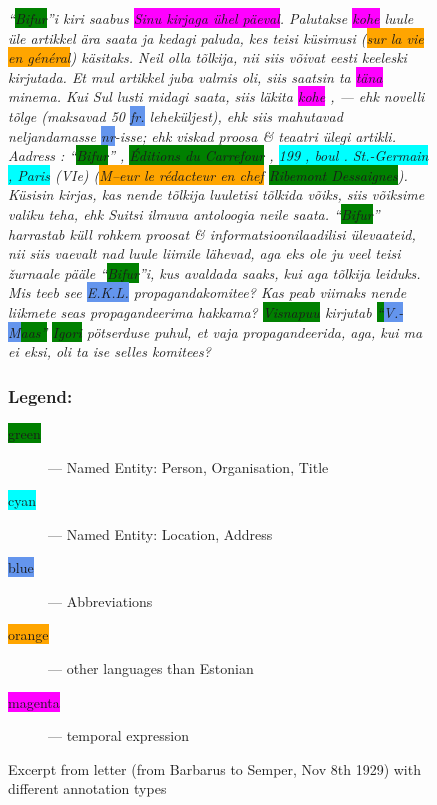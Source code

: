 \documentclass[runningheads]{llncs}
\begin{document}
\begin{figure}
  \centering
  \begin{minipage}{0.8\textwidth}
\itshape
  ``\colorbox{Green}{Bifur}''i kiri saabus \colorbox{Magenta}{Sinu kirjaga \"uhel p\"aeval}. Palutakse \colorbox{Magenta}{kohe} luule \"ule artikkel \"ara saata ja kedagi paluda, kes teisi k\"usimusi
  (\colorbox{Orange}{sur la vie en g\'en\'eral})
käsitaks. Neil olla t\~olkija, nii siis v\~oivat eesti keeleski kirjutada. Et mul artikkel juba valmis oli, siis saatsin ta \colorbox{Magenta}{t\"ana} minema. Kui Sul lusti midagi saata, siis l\"akita \colorbox{Magenta}{kohe} , --- ehk novelli t\~olge (maksavad 50 \colorbox{CornflowerBlue}{fr.} lehek\"uljest), ehk siis mahutavad neljandamasse \colorbox{CornflowerBlue}{nr}-isse; ehk viskad proosa \& teaatri \"ulegi artikli. Aadress : ``\colorbox{Green}{Bifur}'' , \colorbox{Green}{\'Editions du Carrefour} , \colorbox{Cyan}{199 , boul . St.-Germain , Paris} (VIe) (\colorbox{Orange}{M–eur le r\'edacteur en chef}  \colorbox{Green}{Ribemont Dessaignes}). K\"usisin kirjas, kas nende t\~olkija luuletisi t\~olkida v\~oiks, siis v\~oiksime valiku teha, ehk Suitsi ilmuva antoloogia neile saata. ``\colorbox{Green}{Bifur}'' harrastab k\"ull rohkem proosat \& informatsioonilaadilisi \"ulevaateid, nii siis vaevalt nad luule liimile l\"ahevad, aga eks ole ju veel teisi \v{z}urnaale p\"a\"ale ``\colorbox{Green}{Bifur}''i, kus avaldada saaks, kui aga t\~olkija leiduks. Mis teeb see \colorbox{CornflowerBlue}{E.K.L.} propagandakomitee? Kas peab viimaks nende liikmete seas propagandeerima hakkama? \colorbox{Green}{Visnapuu} kirjutab \colorbox{Green}{``\colorbox{CornflowerBlue}{V.-M}aas''} \colorbox{Green}{Igori} p\"otserduse puhul, et vaja propagandeerida, aga, kui ma ei eksi, oli ta ise selles komitees?

  \end{minipage}
  
  \begin{minipage}{\textwidth}
    \vskip1cm
    \subsubsection{Legend:}
    \begin{description}
\item[\colorbox{Green}{green}] --- Named Entity: Person, Organisation, Title
\item[\colorbox{Cyan}{cyan}] --- Named Entity: Location, Address
\item[\colorbox{CornflowerBlue}{blue}] --- Abbreviations
\item[\colorbox{Orange}{orange}] --- other languages than Estonian
\item[\colorbox{Magenta}{magenta}] --- temporal expression
\end{description}

    \end{minipage}
  \caption{Excerpt from letter (from Barbarus to Semper, Nov 8th 1929) with different annotation types}\label{fig1}
\end{figure}
\end{document}
